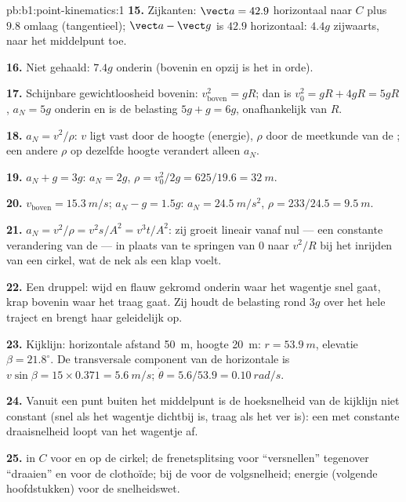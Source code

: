 \begin{solution}{pb:b1:point-kinematics:1}
\textbf{15.} Zijkanten: $\vect a = 42.9$ horizontaal naar $C$ plus $9.8$
omlaag (tangentieel); $\vect a - \vect g$ is $42.9$ horizontaal: $4.4g$
zijwaarts, naar het middelpunt toe.

\textbf{16.} Niet gehaald: $7.4g$ onderin (bovenin en opzij is het in orde).

\textbf{17.} Schijnbare gewichtloosheid bovenin: $v_{\text{boven}}^2 = gR$;
dan is $v_0^2 = gR + 4gR = 5gR$, $a_N = 5g$ onderin en is de belasting
$5g + g = 6g$, onafhankelijk van $R$.

\textbf{18.} $a_N = v^2/\rho$: $v$ ligt vast door de hoogte (energie), $\rho$
door de meetkunde van de ; een andere $\rho$ op dezelfde hoogte verandert
alleen $a_N$.

\textbf{19.} $a_N + g = 3g$: $a_N = 2g$, $\rho = v_0^2/2g = 625/19.6 =
\qty{32}{m}$.

\textbf{20.} $v_{\text{boven}} = \qty{15.3}{m/s}$; $a_N - g = 1.5g$: $a_N =
\qty{24.5}{m/s^2}$, $\rho = 233/24.5 = \qty{9.5}{m}$.

\textbf{21.} $a_N = v^2/\rho = v^2s/A^2 = v^3t/A^2$: zij groeit lineair
vanaf nul --- een constante verandering van de  --- in plaats van
te springen van $0$ naar $v^2/R$ bij het inrijden van een cirkel, wat de nek
als een klap voelt.

\textbf{22.} Een druppel: wijd en flauw gekromd onderin waar het
wagentje snel gaat, krap bovenin waar het traag gaat. Zij houdt de belasting rond
$3g$ over het hele traject en brengt haar geleidelijk op.

\textbf{23.} Kijklijn: horizontale afstand \qty{50}{m}, hoogte
\qty{20}{m}: $r = \qty{53.9}{m}$, elevatie $\beta = 21.8^\circ$. De
transversale component van de horizontale  is $v\sin\beta = 15 \times
0.371 = \qty{5.6}{m/s}$; $\dot\theta = 5.6/53.9 = \qty{0.10}{rad/s}$.

\textbf{24.} Vanuit een punt buiten het middelpunt is de hoeksnelheid van de
kijklijn niet constant (snel als het wagentje dichtbij is, traag als het ver is):
een  met constante draaisnelheid loopt van het wagentje af.

\textbf{25.}  in $C$ voor  en  op
de cirkel; de frenetsplitsing voor ``versnellen'' tegenover ``draaien'' en
voor de clothoïde;  bij de  voor de volgsnelheid;
energie (volgende hoofdstukken) voor de snelheidswet.
\end{solution}
